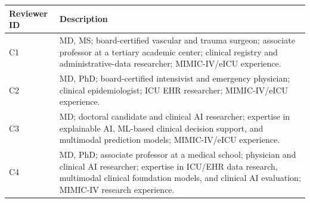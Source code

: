 \begin{tabular}{lp{}}
\toprule
Reviewer ID & Description \\
\midrule
C1 & MD, MS; board-certified vascular and trauma surgeon; associate professor at a tertiary academic center; clinical registry and administrative-data researcher; MIMIC-IV/eICU experience. \\
C2 & MD, PhD; board-certified intensivist and emergency physician; clinical epidemiologist; ICU EHR researcher; MIMIC-IV/eICU experience. \\
C3 & MD; doctoral candidate and clinical AI researcher; expertise in explainable AI, ML-based clinical decision support, and multimodal prediction models; MIMIC-IV/eICU experience. \\
C4 & MD, PhD; associate professor at a medical school; physician and clinical AI researcher; expertise in ICU/EHR data research, multimodal clinical foundation models, and clinical AI evaluation; MIMIC-IV research experience. \\
\bottomrule
\end{tabular}
